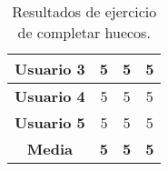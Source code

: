 \begin{table}[H]
{\begin{tabular}{l|ccc|}
            \multicolumn{1}{|l|}{\textbf{Usuario 3}} & \multicolumn{1}{c|}{5}                                                                                                                                          & \multicolumn{1}{c|}{5}                                                                                                                                                                 & 5                                                                                                                                                                                                        \\ \hline
            \multicolumn{1}{|l|}{\textbf{Usuario 4}} & \multicolumn{1}{c|}{5}                                                                                                                                          & \multicolumn{1}{c|}{5}                                                                                                                                                                 & 5                                                                                                                                                                                                        \\ \hline
            \multicolumn{1}{|l|}{\textbf{Usuario 5}} & \multicolumn{1}{c|}{5}                                                                                                                                          & \multicolumn{1}{c|}{5}                                                                                                                                                                 & 5                                                                                                                                                                                                        \\ \hline
            \multicolumn{1}{|c|}{\textbf{Media}}     & \multicolumn{1}{c|}{\textbf{5}}                                                                                                                                 & \multicolumn{1}{c|}{\textbf{5}}                                                                                                                                                        & \textbf{5}                                                                                                                                                                                               \\ \hline
        \end{tabular}
    }
    \caption{Resultados de ejercicio de completar huecos.}
    \label{tab:resultadosCompletarHuecos}
\end{table}

